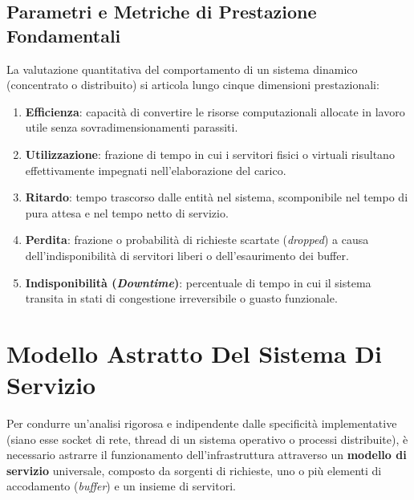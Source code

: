 \documentclass[11pt, a4paper]{article}
\begin{document}
\subsection{Parametri e Metriche di Prestazione Fondamentali}

La valutazione quantitativa del comportamento di un sistema dinamico (concentrato o distribuito) si articola lungo cinque dimensioni prestazionali:
\begin{enumerate}
    \item \textbf{Efficienza}: capacità di convertire le risorse computazionali allocate in lavoro utile senza sovradimensionamenti parassiti.
    \item \textbf{Utilizzazione}: frazione di tempo in cui i servitori fisici o virtuali risultano effettivamente impegnati nell'elaborazione del carico.
    \item \textbf{Ritardo}: tempo trascorso dalle entità nel sistema, scomponibile nel tempo di pura attesa e nel tempo netto di servizio.
    \item \textbf{Perdita}: frazione o probabilità di richieste scartate (\emph{dropped}) a causa dell'indisponibilità di servitori liberi o dell'esaurimento dei buffer.
    \item \textbf{Indisponibilità (\emph{Downtime})}: percentuale di tempo in cui il sistema transita in stati di congestione irreversibile o guasto funzionale.
\end{enumerate}

\newpage


\section{Modello Astratto Del Sistema Di Servizio}

Per condurre un'analisi rigorosa e indipendente dalle specificità implementative (siano esse socket di rete, thread di un sistema operativo o processi distribuite), è necessario astrarre il funzionamento dell'infrastruttura attraverso un \textbf{modello di servizio} universale, composto da sorgenti di richieste, uno o più elementi di accodamento (\emph{buffer}) e un insieme di servitori.

\end{document}
